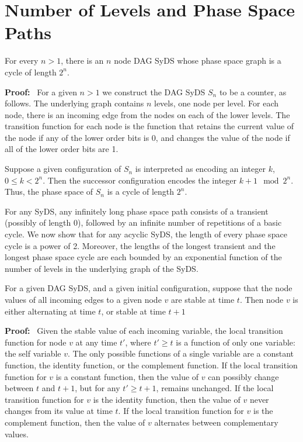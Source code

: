 \section{Number of Levels and Phase Space Paths}
\label{sec:bounded-levels}


\smallskip
\begin{observation}\label{obs:long_phase_space_cycle}
For every $n  > 1$, there is an $n$ node DAG SyDS 
whose phase space graph is a cycle of length $2^n$.
\end{observation}

\noindent
\textbf{Proof:}~ 
For a given $n > 1$ we construct the DAG SyDS $S_n$ to be a counter, as follows.
The underlying graph contains $n$ levels, one node per level. 
For each node, there is an incoming edge from the nodes on each of the lower levels.
The transition function for each node is the function 
that retains the current value of the node if any of the lower order bits is 0,
and changes the value of the node if all of the lower order bits are 1.

Suppose a given configuration of $S_n$ is interpreted as encoding an integer $k$, $0 \leq k < 2^n$.
Then the successor configuration encodes the integer $k + 1 \mod 2^n$.
Thus, the phase space of $S_n$ is a cycle of length $2^n$.
\QED

For any SyDS, any infinitely long phase space path consists of a transient (possibly of length 0),
followed by an infinite number of repetitions of a basic cycle.
We now show that for any acyclic SyDS, the length of every phase space cycle is a power of 2.
Moreover, the lengths of the longest transient and the longest 
phase space cycle are each bounded by an exponential function of the number of levels
in the underlying graph of the SyDS.

\medskip

\begin{lemma}\label{lem:all_inputs_stable}
For a given DAG SyDS, and a given initial configuration,
suppose that the node values of all incoming edges to a given node $v$ are stable at time $t$.
Then node $v$ is either alternating at time $t$, or stable at time $t+1$
\end{lemma}
\noindent
\textbf{Proof:}~ 
Given the stable value of each incoming variable,
the local transition function for node $v$ at any time $t'$, where $t' \geq t$ is a function of 
only one variable: the self variable $v$.
The only possible functions of a single variable are a constant function, the identity function, 
or the complement function.
If the local transition function for $v$ is a constant function, 
then the value of $v$ can possibly change between $t$ and $t+1$, but for any $t'  \geq t+1$, 
remains unchanged.
If the local transition function for $v$ is the identity function, 
then the value of $v$ never changes from its value at time $t$.
If the local transition function for $v$ is the complement function, then
the value of $v$ alternates between complementary values.
\QED

